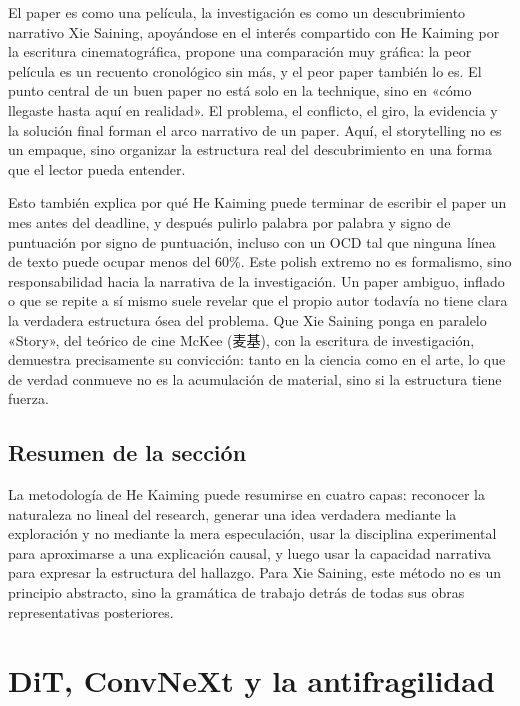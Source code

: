 \documentclass[a4paper,12pt]{article}
\begin{document}
\begin{importantbox}{El paper es como una película, la investigación es como un descubrimiento narrativo}
Xie Saining, apoyándose en el interés compartido con He Kaiming por la escritura cinematográfica, propone una comparación muy gráfica: la peor película es un recuento cronológico sin más, y el peor paper también lo es. El punto central de un buen paper no está solo en la technique, sino en «cómo llegaste hasta aquí en realidad». El problema, el conflicto, el giro, la evidencia y la solución final forman el arco narrativo de un paper. Aquí, el storytelling no es un empaque, sino organizar la estructura real del descubrimiento en una forma que el lector pueda entender.
\end{importantbox}

Esto también explica por qué He Kaiming puede terminar de escribir el paper un mes antes del deadline, y después pulirlo palabra por palabra y signo de puntuación por signo de puntuación, incluso con un OCD tal que ninguna línea de texto puede ocupar menos del 60\%. Este polish extremo no es formalismo, sino responsabilidad hacia la narrativa de la investigación. Un paper ambiguo, inflado o que se repite a sí mismo suele revelar que el propio autor todavía no tiene clara la verdadera estructura ósea del problema. Que Xie Saining ponga en paralelo «Story», del teórico de cine McKee (麦基), con la escritura de investigación, demuestra precisamente su convicción: tanto en la ciencia como en el arte, lo que de verdad conmueve no es la acumulación de material, sino si la estructura tiene fuerza.

\subsection{Resumen de la sección}

La metodología de He Kaiming puede resumirse en cuatro capas: reconocer la naturaleza no lineal del research, generar una idea verdadera mediante la exploración y no mediante la mera especulación, usar la disciplina experimental para aproximarse a una explicación causal, y luego usar la capacidad narrativa para expresar la estructura del hallazgo. Para Xie Saining, este método no es un principio abstracto, sino la gramática de trabajo detrás de todas sus obras representativas posteriores.
\section{DiT, ConvNeXt y la antifragilidad}
\end{document}
